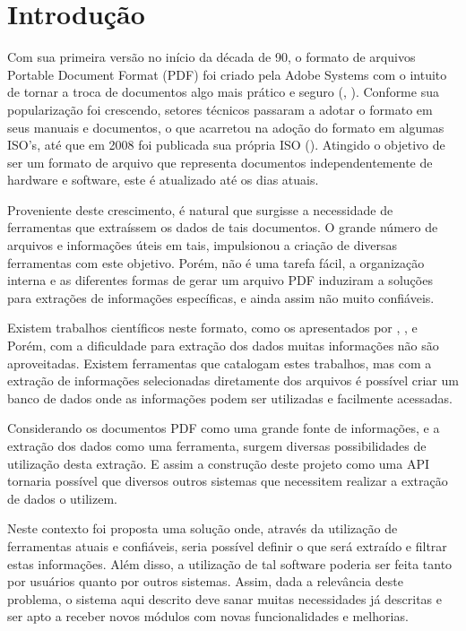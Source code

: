 \chapter{Introdução}

Com sua primeira versão no início da década de 90, o formato de arquivos Portable Document Format (PDF) foi criado pela Adobe Systems com o intuito de tornar a troca de documentos algo mais prático e seguro (\citeauthor{lin2011mathematical}, \citeyear{lin2011mathematical}). Conforme sua popularização foi crescendo, setores técnicos passaram a adotar o formato em seus manuais e documentos, o que acarretou na adoção do formato em algumas ISO's, até que em 2008 foi publicada sua própria ISO (\hspace{1sp}\cite{ISO32000}).
Atingido o objetivo de ser um formato de arquivo que representa documentos independentemente de hardware e software, este é atualizado até os dias atuais.

Proveniente deste crescimento, é natural que surgisse a necessidade de ferramentas que extraíssem os dados de tais documentos. O grande número de arquivos e informações úteis em tais, impulsionou a criação de diversas ferramentas com este objetivo. Porém, não é uma tarefa fácil, a organização interna e as diferentes formas de gerar um arquivo PDF induziram a soluções para extrações de informações específicas, e ainda assim não muito confiáveis.

Existem trabalhos científicos neste formato, como os apresentados por \citeauthor{sasirekhatext}, \citeauthor{ajedig2011pdf}, \citeauthor{marinai2009metadata} e \citeauthor{lin2011mathematical} Porém, com a dificuldade para extração dos dados muitas informações não são aproveitadas. Existem ferramentas que catalogam estes trabalhos, mas com a extração de informações selecionadas diretamente dos arquivos é possível criar um banco de dados onde as informações podem ser utilizadas e facilmente acessadas.

Considerando os documentos PDF como uma grande fonte de informações, e a extração dos dados como uma ferramenta, surgem diversas possibilidades de utilização desta extração. E assim a construção deste projeto como uma API tornaria possível que diversos outros sistemas que necessitem realizar a extração de dados o utilizem.

Neste contexto foi proposta uma solução onde, através da utilização de ferramentas atuais e confiáveis, seria possível definir o que será extraído e filtrar estas informações. Além disso, a utilização de tal software poderia ser feita tanto por usuários quanto por outros sistemas. Assim, dada a relevância deste problema, o sistema aqui descrito deve sanar muitas necessidades já descritas e ser apto a receber novos módulos com novas funcionalidades e melhorias.

